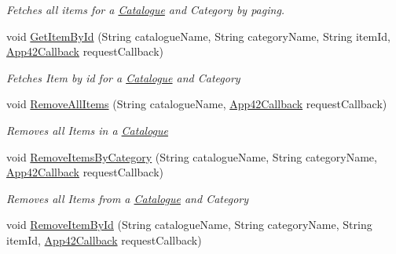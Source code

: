\begin{DoxyCompactItemize}
\begin{DoxyCompactList}\small\item\em Fetches all items for a \hyperlink{classcom_1_1shephertz_1_1app42_1_1paas_1_1sdk_1_1windows_1_1shopping_1_1_catalogue}{Catalogue} and Category by paging. \end{DoxyCompactList}\item 
void \hyperlink{classcom_1_1shephertz_1_1app42_1_1paas_1_1sdk_1_1windows_1_1shopping_1_1_catalogue_service_a60023856ef333d6982f8da3a6922fbe8}{Get\+Item\+By\+Id} (String catalogue\+Name, String category\+Name, String item\+Id, \hyperlink{interfacecom_1_1shephertz_1_1app42_1_1paas_1_1sdk_1_1windows_1_1_app42_callback}{App42\+Callback} request\+Callback)
\begin{DoxyCompactList}\small\item\em Fetches Item by id for a \hyperlink{classcom_1_1shephertz_1_1app42_1_1paas_1_1sdk_1_1windows_1_1shopping_1_1_catalogue}{Catalogue} and Category \end{DoxyCompactList}\item 
void \hyperlink{classcom_1_1shephertz_1_1app42_1_1paas_1_1sdk_1_1windows_1_1shopping_1_1_catalogue_service_a57f5facaf1deeabe3d77980627d714d9}{Remove\+All\+Items} (String catalogue\+Name, \hyperlink{interfacecom_1_1shephertz_1_1app42_1_1paas_1_1sdk_1_1windows_1_1_app42_callback}{App42\+Callback} request\+Callback)
\begin{DoxyCompactList}\small\item\em Removes all Items in a \hyperlink{classcom_1_1shephertz_1_1app42_1_1paas_1_1sdk_1_1windows_1_1shopping_1_1_catalogue}{Catalogue} \end{DoxyCompactList}\item 
void \hyperlink{classcom_1_1shephertz_1_1app42_1_1paas_1_1sdk_1_1windows_1_1shopping_1_1_catalogue_service_a7a372bb16bf6cbc7ea562f3617268ebc}{Remove\+Items\+By\+Category} (String catalogue\+Name, String category\+Name, \hyperlink{interfacecom_1_1shephertz_1_1app42_1_1paas_1_1sdk_1_1windows_1_1_app42_callback}{App42\+Callback} request\+Callback)
\begin{DoxyCompactList}\small\item\em Removes all Items from a \hyperlink{classcom_1_1shephertz_1_1app42_1_1paas_1_1sdk_1_1windows_1_1shopping_1_1_catalogue}{Catalogue} and Category \end{DoxyCompactList}\item 
void \hyperlink{classcom_1_1shephertz_1_1app42_1_1paas_1_1sdk_1_1windows_1_1shopping_1_1_catalogue_service_af0ac50072965e71a7a93a83274448420}{Remove\+Item\+By\+Id} (String catalogue\+Name, String category\+Name, String item\+Id, \hyperlink{interfacecom_1_1shephertz_1_1app42_1_1paas_1_1sdk_1_1windows_1_1_app42_callback}{App42\+Callback} request\+Callback)

\end{DoxyCompactItemize}
